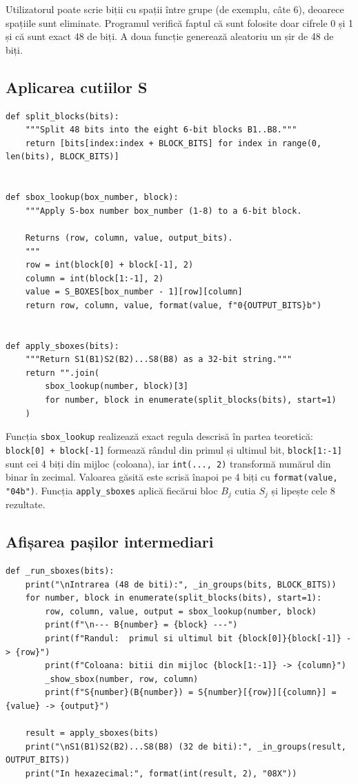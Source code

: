 \documentclass[12pt,a4paper]{article}
\begin{document}
Utilizatorul poate scrie biții cu spații între grupe (de exemplu, câte 6),
deoarece spațiile sunt eliminate. Programul verifică faptul că sunt folosite doar
cifrele 0 și 1 și că sunt exact 48 de biți. A doua funcție generează aleatoriu un
șir de 48 de biți.

\subsection{Aplicarea cutiilor S}

\begin{lstlisting}[caption={Împărțirea în blocuri și căutarea în cutiile S}]
def split_blocks(bits):
    """Split 48 bits into the eight 6-bit blocks B1..B8."""
    return [bits[index:index + BLOCK_BITS] for index in range(0, len(bits), BLOCK_BITS)]


def sbox_lookup(box_number, block):
    """Apply S-box number box_number (1-8) to a 6-bit block.

    Returns (row, column, value, output_bits).
    """
    row = int(block[0] + block[-1], 2)
    column = int(block[1:-1], 2)
    value = S_BOXES[box_number - 1][row][column]
    return row, column, value, format(value, f"0{OUTPUT_BITS}b")


def apply_sboxes(bits):
    """Return S1(B1)S2(B2)...S8(B8) as a 32-bit string."""
    return "".join(
        sbox_lookup(number, block)[3]
        for number, block in enumerate(split_blocks(bits), start=1)
    )
\end{lstlisting}

Funcția \texttt{sbox\_lookup} realizează exact regula descrisă în partea teoretică:
\texttt{block[0] + block[-1]} formează rândul din primul și ultimul bit,
\texttt{block[1:-1]} sunt cei 4 biți din mijloc (coloana), iar \texttt{int(..., 2)}
transformă numărul din binar în zecimal. Valoarea găsită este scrisă înapoi pe
4 biți cu \texttt{format(value, "04b")}. Funcția \texttt{apply\_sboxes} aplică
fiecărui bloc $B_j$ cutia $S_j$ și lipește cele 8 rezultate.

\subsection{Afișarea pașilor intermediari}

\begin{lstlisting}[caption={Afișarea fiecărui pas și a rezultatului final}]
def _run_sboxes(bits):
    print("\nIntrarea (48 de biti):", _in_groups(bits, BLOCK_BITS))
    for number, block in enumerate(split_blocks(bits), start=1):
        row, column, value, output = sbox_lookup(number, block)
        print(f"\n--- B{number} = {block} ---")
        print(f"Randul:  primul si ultimul bit {block[0]}{block[-1]} -> {row}")
        print(f"Coloana: bitii din mijloc {block[1:-1]} -> {column}")
        _show_sbox(number, row, column)
        print(f"S{number}(B{number}) = S{number}[{row}][{column}] = {value} -> {output}")

    result = apply_sboxes(bits)
    print("\nS1(B1)S2(B2)...S8(B8) (32 de biti):", _in_groups(result, OUTPUT_BITS))
    print("In hexazecimal:", format(int(result, 2), "08X"))
\end{lstlisting}
\end{document}
